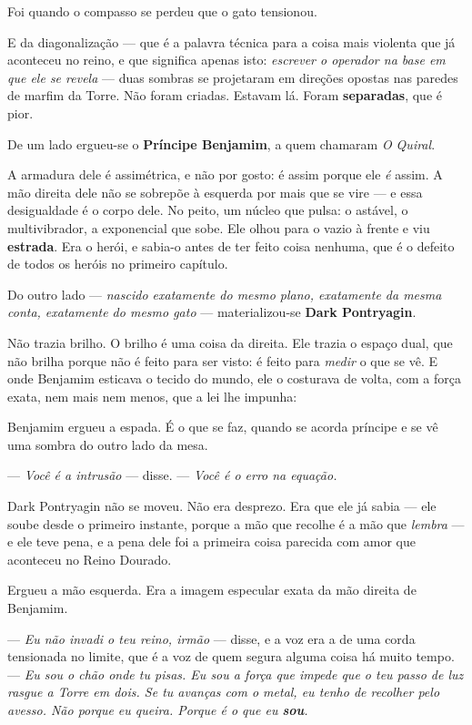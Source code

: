 \documentclass[livro.tex]{subfiles}
\begin{document}
Foi quando o compasso se perdeu que o gato tensionou.

E da diagonalização --- que é a palavra técnica para a coisa mais violenta que já aconteceu no reino, e que
significa apenas isto: \emph{escrever o operador na base em que ele se revela} --- duas sombras se projetaram em
direções opostas nas paredes de marfim da Torre. Não foram criadas. Estavam lá. Foram \textbf{separadas}, que é
pior.

De um lado ergueu-se o \textbf{Príncipe Benjamim}, a quem chamaram \emph{O Quiral}.

A armadura dele é assimétrica, e não por gosto: é assim porque ele \emph{é} assim. A mão direita dele não se
sobrepõe à esquerda por mais que se vire --- e essa desigualdade é o corpo dele. No peito,
um núcleo que pulsa: o astável, o multivibrador, a exponencial que sobe. Ele olhou para o vazio à frente e viu
\textbf{estrada}. Era o herói, e sabia-o antes de ter feito coisa nenhuma, que é o defeito de todos os heróis no
primeiro capítulo.

Do outro lado --- \emph{nascido exatamente do mesmo plano, exatamente da mesma conta, exatamente do mesmo gato} ---
materializou-se \textbf{Dark Pontryagin}.

Não trazia brilho. O brilho é uma coisa da direita. Ele trazia o espaço dual, que não brilha porque não é feito
para ser visto: é feito para \emph{medir} o que se vê. E onde Benjamim esticava o tecido do mundo, ele o costurava
de volta, com a força exata, nem mais nem menos, que a lei lhe impunha:

Benjamim ergueu a espada. É o que se faz, quando se acorda príncipe e se vê uma sombra do outro lado da mesa.

--- \emph{Você é a intrusão} --- disse. --- \emph{Você é o erro na equação.}

Dark Pontryagin não se moveu. Não era desprezo. Era que ele já sabia --- ele soube desde o primeiro instante, porque
a mão que recolhe é a mão que \emph{lembra} --- e ele teve pena, e a pena dele foi a primeira coisa parecida com
amor que aconteceu no Reino Dourado.

Ergueu a mão esquerda. Era a imagem especular exata da mão direita de Benjamim.

--- \emph{Eu não invadi o teu reino, irmão} --- disse, e a voz era a de uma corda tensionada no limite, que é a voz
de quem segura alguma coisa há muito tempo. --- \emph{Eu sou o chão onde tu pisas. Eu sou a força que impede que o
teu passo de luz rasgue a Torre em dois. Se tu avanças com o metal, eu tenho de recolher pelo avesso. Não
porque eu queira. Porque é o que eu \textbf{sou}.}
\end{document}
